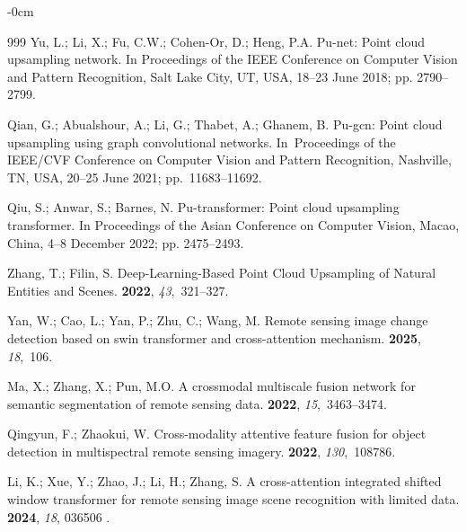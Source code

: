 \documentclass[remotesensing,article,accept,pdftex,moreauthors]{Definitions/mdpi}
\begin{document}
\begin{adjustwidth}{-\extralength}{0cm}
\begin{thebibliography}{999}
Yu, L.; Li, X.; Fu, C.W.; Cohen-Or, D.; Heng, P.A.
\newblock Pu-net: Point cloud upsampling network.
\newblock In Proceedings of the IEEE Conference on Computer
  Vision and Pattern Recognition, Salt Lake City, UT, USA, 18--23 June 2018; pp. 2790--2799.

Qian, G.; Abualshour, A.; Li, G.; Thabet, A.; Ghanem, B.
\newblock Pu-gcn: Point cloud upsampling using graph convolutional networks.
\newblock In~Proceedings of the IEEE/CVF Conference on
  Computer Vision and Pattern Recognition, Nashville, TN, USA, 20--25 June 2021; \mbox{pp. 11683--11692}.

Qiu, S.; Anwar, S.; Barnes, N.
\newblock Pu-transformer: Point cloud upsampling transformer.
\newblock In Proceedings of the Asian Conference on Computer
  Vision, Macao, China, 4--8 December 2022; pp. 2475--2493.

Zhang, T.; Filin, S.
\newblock Deep-Learning-Based Point Cloud Upsampling of Natural Entities and
  Scenes.
 {\bf 2022}, {\em 43},~321--327.

Yan, W.; Cao, L.; Yan, P.; Zhu, C.; Wang, M.
\newblock Remote sensing image change detection based on swin transformer and
  cross-attention mechanism.
 {\bf 2025}, {\em 18},~106.

Ma, X.; Zhang, X.; Pun, M.O.
\newblock A crossmodal multiscale fusion network for semantic segmentation of
  remote sensing data.
 {\bf 2022}, {\em 15},~3463--3474.

Qingyun, F.; Zhaokui, W.
\newblock Cross-modality attentive feature fusion for object detection in
  multispectral remote sensing imagery.
 {\bf 2022}, {\em 130},~108786.

Li, K.; Xue, Y.; Zhao, J.; Li, H.; Zhang, S.
\newblock A cross-attention integrated shifted window transformer for remote
  sensing image scene recognition with limited data.
 {\bf 2024}, {\em
  18}, 036506
.


\end{thebibliography}
\end{adjustwidth}
\end{document}
